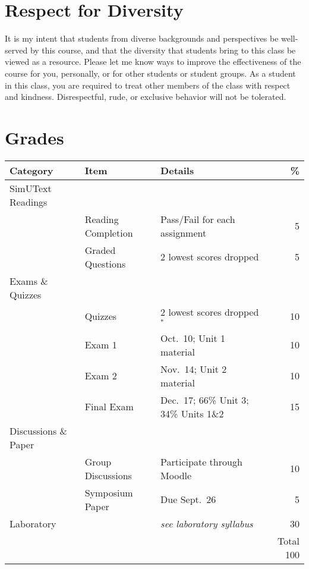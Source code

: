 \documentclass{tufte-handout}
\begin{document}
\begin{fullwidth}
\section{Respect for Diversity}

It is my intent that students from diverse backgrounds and perspectives be well-served by this course, and that the diversity that students bring to this class be viewed as a resource. Please let me know ways to improve the effectiveness of the course for you, personally, or for other students or student groups. As a student in this class, you are required to treat other members of the class with respect and kindness. Disrespectful, rude, or exclusive behavior will not be tolerated.

\section{Grades}


\begin{table}
\begin{tabular}{l l l r}
Category & Item & Details & \% \\
\hline
SimUText Readings & \\
& Reading Completion & Pass/Fail for each assignment & 5 \\
& Graded Questions & 2 lowest scores dropped & 5 \\
\hline
Exams \& Quizzes \\
& Quizzes & 2 lowest scores dropped$^*$ & 10 \\
& Exam 1 & Oct.~10; Unit 1 material & 10 \\
& Exam 2 & Nov.~14; Unit 2 material & 10 \\
& Final Exam & Dec.~17; 66\% Unit 3; 34\% Units 1\&2 & 15 \\ 							%
\hline 
Discussions \& Paper \\
& Group Discussions & Participate through Moodle & 10 \\
 & Symposium Paper & Due Sept.~26 & 5 \\
\hline
Laboratory & & \emph{see laboratory syllabus} & 30 \\
\hline
& & & Total 100
\end{tabular}
\end{table}

\end{fullwidth}
\end{document}
